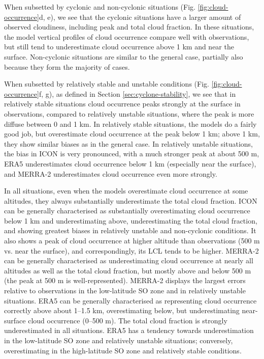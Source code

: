 \documentclass[12pt,a4paper]{article}
\begin{document}
When subsetted by cyclonic and non-cyclonic situations (Fig.
\ref{fig:cloud-occurrence}d, e), we see that the cyclonic situations have a
larger amount of observed cloudiness, including peak and total cloud
fraction. In these situations, the model vertical profiles of cloud occurrence compare well with observations, but still tend to
underestimate cloud occurrence above 1 km and near the surface. Non-cyclonic
situations are similar to the general case, partially also because they form
the majority of cases.

When subsetted by relatively stable and unstable conditions (Fig.
\ref{fig:cloud-occurrence}f, g), as defined in Section
\ref{sec:cyclone-stability}, we see that in relatively stable
situations cloud occurrence peaks strongly at the surface in observations,
compared to relatively unstable situations, where the peak is more diffuse
between 0 and 1 km.  In relatively stable
situations, the models do a fairly good job, but overestimate cloud
occurrence at the peak below 1 km; above 1 km, they show similar biases as in
the general case.  In relatively unstable situations, the bias in ICON is
very pronounced, with a much stronger peak at about 500 m, ERA5 underestimates cloud occurrence below 1 km (especially near the surface), and
MERRA-2 underestimates cloud occurrence even more strongly.

In all situations, even when the models overestimate cloud occurrence at some
altitudes, they always substantially underestimate the total cloud fraction.
ICON can be generally characterised as substantially overestimating cloud
occurrence below 1 km and underestimating above, underestimating the total
cloud fraction, and showing greatest biases in relatively unstable and
non-cyclonic conditions. It also shows a peak of cloud occurrence at higher
altitude than observations (500 m vs. near the surface), and correspondingly,
its LCL tends to be higher. MERRA-2 can be generally characterised as
underestimating cloud occurrence at nearly all altitudes as well as the total
cloud fraction, but mostly above and below 500 m (the peak at 500 m is
well-represented). MERRA-2 displays the largest errors relative to observations in the low-latitude SO zone and in relatively unstable situations. ERA5 can be generally characterised as
representing cloud occurrence correctly above about 1--1.5 km, overestimating
below, but underestimating near-surface cloud occurrence (0--500 m). The total
cloud fraction is strongly underestimated in all situations. ERA5 has a tendency
towards underestimation in the low-latitude SO zone and relatively unstable
situations; conversely, overestimating in the high-latitude SO zone and relatively stable conditions.
\end{document}
